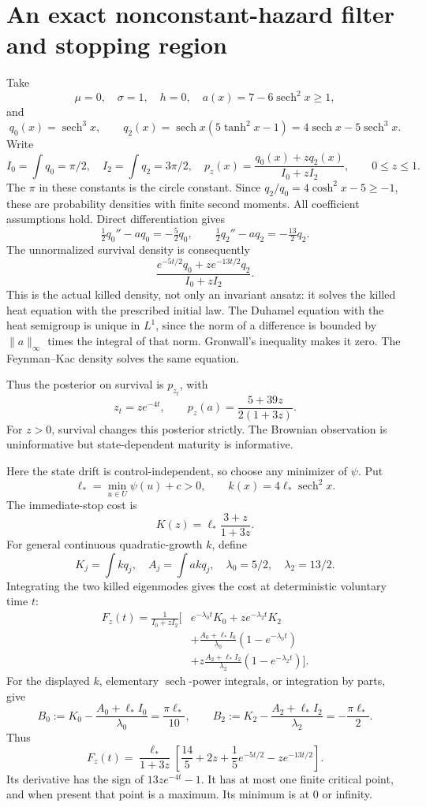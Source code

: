 \documentclass[11pt,a4paper]{article}
\theoremstyle{definition}
\theoremstyle{remark}
\newcommand{\sech}{\operatorname{sech}}
\begin{document}
\section{An exact nonconstant-hazard filter and stopping region}

Take
\[
 \mu=0,\quad \sigma=1,\quad h=0,\quad
 a(x)=7-6\sech^2x\geq1,
\]
and
\[
 q_0(x)=\sech^3x,\qquad
 q_2(x)=\sech x(5\tanh^2x-1)=4\sech x-5\sech^3x.
\]
Write
\[
 I_0=\int q_0=\pi/2,\quad I_2=\int q_2=3\pi/2,\quad
 p_z(x)=\frac{q_0(x)+zq_2(x)}{I_0+zI_2},\qquad0\leq z\leq1.
\]
The \(\pi\) in these constants is the circle constant.
Since \(q_2/q_0=4\cosh^2x-5\geq-1\), these are probability densities
with finite second moments. All coefficient assumptions hold.
Direct differentiation gives
\[
 \tfrac12q_0''-a q_0=-\tfrac52q_0,\qquad
 \tfrac12q_2''-a q_2=-\tfrac{13}{2}q_2.
\]
The unnormalized survival density is consequently
\[
 \frac{e^{-5t/2}q_0+ze^{-13t/2}q_2}{I_0+zI_2}.
\]
This is the actual killed density, not only an invariant ansatz:
it solves the killed heat equation with the prescribed initial law.
The Duhamel equation with the heat semigroup is unique in \(L^1\),
since the norm of a difference is bounded by \(\|a\|_\infty\)
times the integral of that norm. Gronwall's inequality makes it zero.
The Feynman--Kac density solves the same equation.

Thus the posterior on survival is \(p_{z_t}\), with
\[
 z_t=ze^{-4t},\qquad
 p_z(a)=\frac{5+39z}{2(1+3z)}.
\]
For \(z>0\), survival changes this posterior strictly.
The Brownian observation is uninformative but state-dependent
maturity is informative.

Here the state drift is control-independent, so choose any minimizer
of \(\psi\). Put
\[
 \ell_*=\min_{u\in U}\psi(u)+c>0,\qquad
 k(x)=4\ell_*\sech^2x.
\]
The immediate-stop cost is
\[
 K(z)=\ell_*\frac{3+z}{1+3z}.
\]
For general continuous quadratic-growth \(k\), define
\[
 K_j=\int kq_j,\quad A_j=\int akq_j,\quad
 \lambda_0=5/2,\quad\lambda_2=13/2.
\]
Integrating the two killed eigenmodes gives the cost at deterministic
voluntary time \(t\):
\begin{equation}\label{eq:Fgeneral}
 \begin{split}
 F_z(t)=\frac1{I_0+zI_2}\bigg[
 &e^{-\lambda_0t}K_0+ze^{-\lambda_2t}K_2\\
 &+\frac{A_0+\ell_*I_0}{\lambda_0}(1-e^{-\lambda_0t})\\
 &+z\frac{A_2+\ell_*I_2}{\lambda_2}(1-e^{-\lambda_2t})
 \bigg].
 \end{split}
\end{equation}
For the displayed \(k\), elementary \(\sech\)-power integrals,
or integration by parts, give
\[
 B_0:=K_0-\frac{A_0+\ell_*I_0}{\lambda_0}
               =\frac{\pi\ell_*}{10},\qquad
 B_2:=K_2-\frac{A_2+\ell_*I_2}{\lambda_2}
               =-\frac{\pi\ell_*}{2}.
\]
Thus
\begin{equation}\label{eq:Fexplicit}
 F_z(t)=\frac{\ell_*}{1+3z}
 \left[\frac{14}{5}+2z+\frac15e^{-5t/2}
                                -ze^{-13t/2}\right].
\end{equation}
Its derivative has the sign of \(13ze^{-4t}-1\).
It has at most one finite critical point, and when present that
point is a maximum. Its minimum is at \(0\) or infinity.
\end{document}
